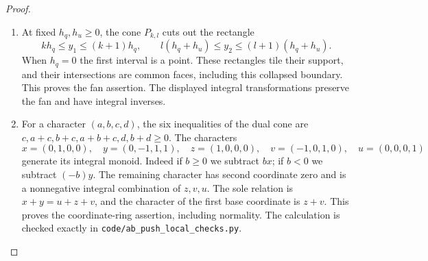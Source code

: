 \begin{proof}
\begin{enumerate}[label=\arabic*.,leftmargin=*]
\item At fixed $h_q,h_u\geq0$, the cone $P_{k,l}$ cuts out the rectangle
\[
 kh_q\leq y_1\leq(k+1)h_q,\qquad
 l(h_q+h_u)\leq y_2\leq(l+1)(h_q+h_u).
\]
When $h_q=0$ the first interval is a point. These rectangles tile
their support, and their intersections are common faces, including
this collapsed boundary. This proves the fan assertion. The displayed
integral transformations preserve the fan and have integral inverses.

\item For a character $(a,b,c,d)$, the six inequalities of the dual cone
are $c,a+c,b+c,a+b+c,d,b+d\geq0$. The characters
\[
 x=(0,1,0,0),\quad y=(0,-1,1,1),\quad
 z=(1,0,0,0),\quad v=(-1,0,1,0),\quad u=(0,0,0,1)
\]
generate its integral monoid. Indeed if $b\geq0$ we subtract $b x$;
if $b<0$ we subtract $(-b)y$. The remaining character has second
coordinate zero and is a nonnegative integral combination of $z,v,u$.
The sole relation is $x+y=u+z+v$, and the character of the first
base coordinate is $z+v$. This proves the coordinate-ring assertion,
including normality. The calculation is checked exactly in
\texttt{code/ab\_push\_local\_checks.py}.
\end{enumerate}
\end{proof}

